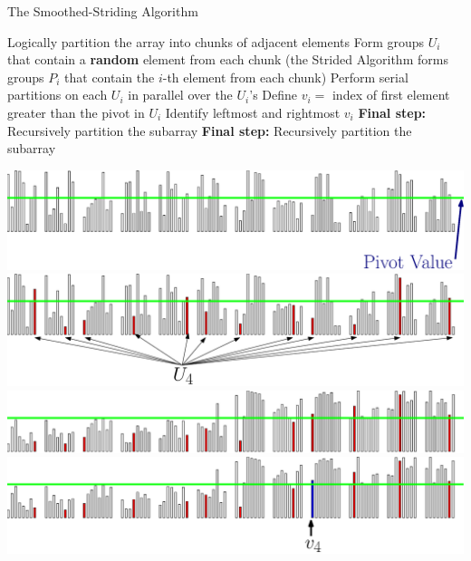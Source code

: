 \documentclass[xcolor=x11names, svgnames, rgb]{beamer}
\begin{document}
\begin{frame}[t]{}
	\vfill
	\begin{center}
		{\Huge The Smoothed-Striding Algorithm}
	\end{center}
	\vfill
\end{frame}


\begin{frame}[t]{}%
	\vspace{0.25cm}
	\begin{overprint}
	Logically partition the array into chunks of adjacent elements
  Form groups $U_i$ that contain a \textbf{random}
  element from each chunk (the Strided Algorithm forms groups
  $P_i$ that contain the $i$-th element from each chunk) 
	\onslide<3>Perform serial partitions on each $U_i$ in parallel over the $U_i$'s
	\onslide<4>Define $v_i = $ index of first element greater than the pivot in $U_i$
	\onslide<5>Identify leftmost and rightmost $v_i$
	\onslide<6>\textbf{Final step:} Recursively partition the subarray
	\onslide<7>\textbf{Final step:} Recursively partition the subarray
	\end{overprint}
	\vspace{0.25cm}
	\begin{overprint}
	\includegraphics[width=\linewidth]{imgs/smoothedStridingAlgSim/sim1.eps}
	\onslide<2>\includegraphics[width=\linewidth]{imgs/smoothedStridingAlgSim/sim2.eps}
	\onslide<3>\includegraphics[width=\linewidth]{imgs/smoothedStridingAlgSim/sim3.eps}
	\onslide<4>\includegraphics[width=\linewidth]{imgs/smoothedStridingAlgSim/sim35.eps}

\end{overprint}
\end{frame}
\end{document}
